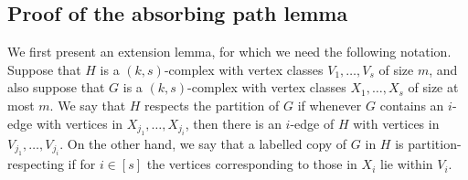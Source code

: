 \documentclass[11pt, reqno]{amsart}    	%
\newtheorem{lemma}[thm]{Lemma}
\theoremstyle{definition}
\numberwithin{equation}{section}
\begin{document}
	
	
	
	
	
	
	\begin{appendix}
		\section{Proof of the absorbing path lemma}
		We first present an extension lemma, for which we need the following notation.
		Suppose that $H$ is a $(k, s)$-complex with vertex classes $V_1,\dots,V_s$ of size $m$, and also suppose that $G$ is a $(k, s)$-complex with vertex classes $X_1,\dots, X_s$ of size at most $m$. We say that $H$ respects the partition of $G$ if whenever $G$ contains an $i$-edge with vertices in $X_{j_1}, \dots , X_{j_i}$, then there is an $i$-edge of $H$ with vertices in $V_{j_1}, \dots , V_{j_i}$. On the other hand, we say that a labelled copy of $G$ in $H$ is partition-respecting if for $i \in [s]$ the vertices corresponding to those in $X_i$ lie within $V_i$.
		
		

\end{appendix}
\end{document}
